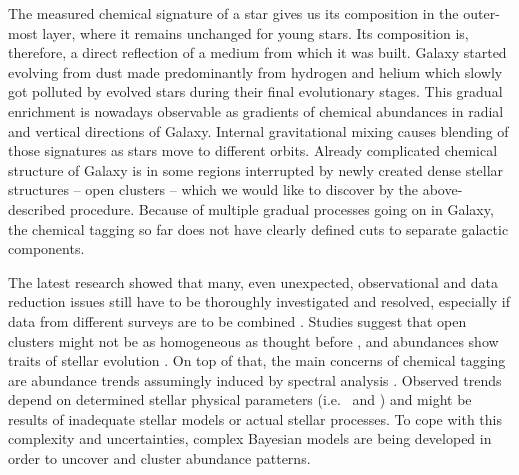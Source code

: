 The measured chemical signature of a star gives us its composition in the outer-most layer, where it remains unchanged for young stars. Its composition is, therefore, a direct reflection of a medium from which it was built. Galaxy started evolving from dust made predominantly from hydrogen and helium which slowly got polluted by evolved stars during their final evolutionary stages. This gradual enrichment is nowadays observable as gradients of chemical abundances in radial and vertical directions of Galaxy. Internal gravitational mixing causes blending of those signatures as stars move to different orbits. Already complicated chemical structure of Galaxy is in some regions interrupted by newly created dense stellar structures -- open clusters -- which we would like to discover by the above-described procedure. Because of multiple gradual processes going on in Galaxy, the chemical tagging so far does not have clearly defined cuts to separate galactic components.

The latest research showed that many, even unexpected, observational and data reduction issues still have to be thoroughly investigated and resolved, especially if data from different surveys are to be combined \cite{2019ARA&A..57..571J}. Studies suggest that open clusters might not be as homogeneous as thought before \cite{2016ApJ...817...49B, 2018MNRAS.473.4612K}, and abundances show traits of stellar evolution \cite{2015A&A...577A..47B, 2017ApJ...840...99D, 2018MNRAS.478..425B}. On top of that, the main concerns of chemical tagging are abundance trends assumingly induced by spectral analysis \cite{2016ApJ...817...49B, 2019arXiv191208539C, 2020arXiv200103179B}. Observed trends depend on determined stellar physical parameters (i.e. \Teff\ and \vsin) and might be results of inadequate stellar models or actual stellar processes. To cope with this complexity and uncertainties, complex Bayesian models are being developed \cite{2016ApJ...817...49B, 2019ApJ...887...73C} in order to uncover and cluster abundance patterns.

